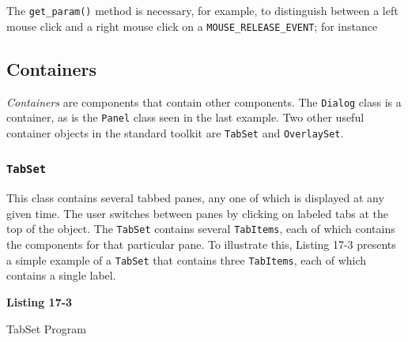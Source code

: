 The \texttt{get\_param()} method is necessary, for example, to
distinguish between a left mouse click and a right mouse click on a
\texttt{MOUSE\_RELEASE\_EVENT}; for instance 


\subsection{Containers}

\textit{Containers} are components that contain other components.
The \texttt{Dialog} class is a container, as is
the \texttt{Panel} class seen in the last example.
Two other useful container objects in the standard toolkit are \texttt{TabSet}
and \texttt{OverlaySet}.

\subsubsection[TabSet]{\texttt{TabSet}}
This class contains several tabbed panes, any one of which is displayed at any given
time. The user switches between panes by clicking on labeled tabs
at the top of the object. The \texttt{TabSet} contains several
\texttt{TabItems}, each of which contains the components for that
particular pane. To illustrate this, Listing 17-3 presents a simple
example of a \texttt{TabSet} that contains three \texttt{TabItems},
each of which contains a single label.

\bigskip

{\sffamily\bfseries
Listing 17-3

TabSet Program}

